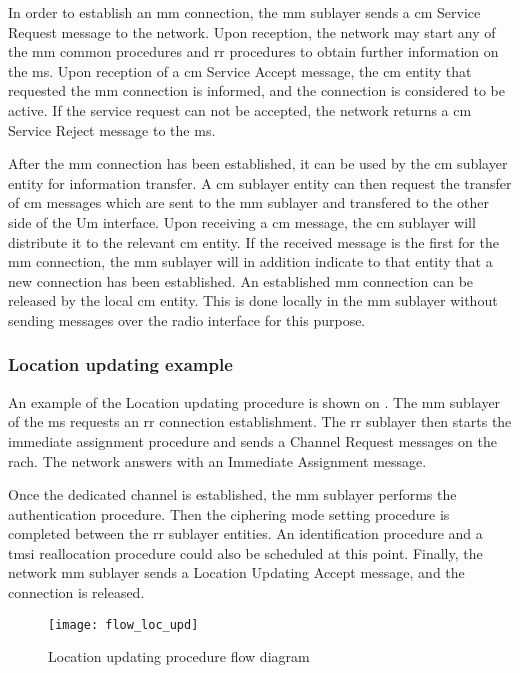   In order to establish an \gls{mm} connection, the \gls{mm} sublayer
  sends a \gls{cm} Service Request message to the network. Upon
  reception, the network may start any of the \gls{mm} common
  procedures and \gls{rr} procedures to obtain further information on
  the \gls{ms}. Upon reception of a \gls{cm} Service Accept message,
  the \gls{cm} entity that requested the \gls{mm} connection is
  informed, and the connection is considered to be active. If the
  service request can not be accepted, the network returns a \gls{cm}
  Service Reject message to the \gls{ms}.

  After the \gls{mm} connection has been established, it can be used
  by the \gls{cm} sublayer entity for information transfer. A \gls{cm}
  sublayer entity can then request the transfer of \gls{cm} messages
  which are sent to the \gls{mm} sublayer and transfered to the other
  side of the Um interface. Upon receiving a \gls{cm} message, the
  \gls{cm} sublayer will distribute it to the relevant \gls{cm}
  entity. If the received message is the first for the \gls{mm}
  connection, the \gls{mm} sublayer will in addition indicate to that
  entity that a new connection has been established. An established
  \gls{mm} connection can be released by the local \gls{cm} entity.
  This is done locally in the \gls{mm} sublayer without sending
  messages over the radio interface for this purpose.

  \subsubsection{Location updating example}

  An example of the Location updating procedure is shown on
  . The \gls{mm} sublayer of the \gls{ms}
  requests an \gls{rr} connection establishment. The \gls{rr} sublayer
  then starts the immediate assignment procedure and sends a Channel
  Request messages on the \gls{rach}. The network answers with an
  Immediate Assignment message.

  Once the dedicated channel is established, the \gls{mm} sublayer
  performs the authentication procedure. Then the ciphering mode
  setting procedure is completed between the \gls{rr} sublayer
  entities. An identification procedure and a \gls{tmsi}
  reallocation procedure could also be scheduled at this point.
  Finally, the network \gls{mm} sublayer sends a Location Updating
  Accept message, and the connection is released.

    \begin{figure}
      \centering
      \texttt{[image: flow\_loc\_upd]}
      \caption{Location updating procedure flow
      diagram~\cite[p.~117]{3gpp_ts_2014-6}}
      \label{fig:flow_loc_upd}
    \end{figure}

